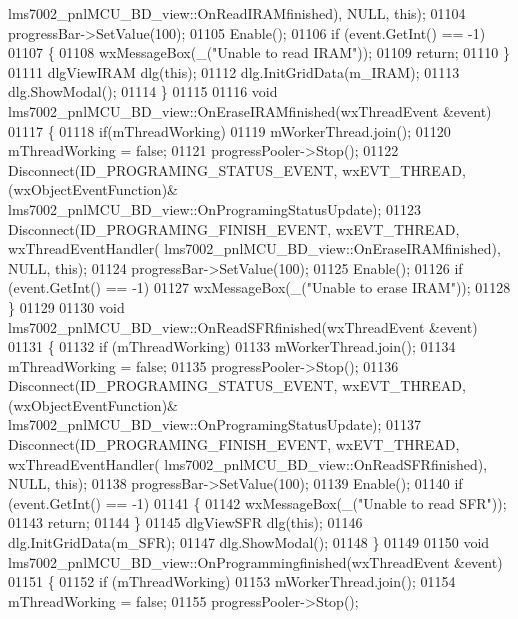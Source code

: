 \begin{DoxyCode}
{{{{{{{{{{{{{{{{{{{      lms7002_pnlMCU_BD_view::OnReadIRAMfinished), NULL, \textcolor{keyword}{this});
01104     progressBar->SetValue(100);
01105     Enable();
01106     \textcolor{keywordflow}{if} (event.GetInt() == -1)
01107     \{
01108         wxMessageBox(\_(\textcolor{stringliteral}{"Unable to read IRAM"}));
01109         \textcolor{keywordflow}{return};
01110     \}
01111     dlgViewIRAM dlg(\textcolor{keyword}{this});
01112     dlg.InitGridData(m_IRAM);
01113     dlg.ShowModal();
01114 \}
01115 
01116 \textcolor{keywordtype}{void} lms7002_pnlMCU_BD_view::OnEraseIRAMfinished(wxThreadEvent &event)
01117 \{
01118     \textcolor{keywordflow}{if}(mThreadWorking)
01119         mWorkerThread.join();
01120     mThreadWorking = \textcolor{keyword}{false};
01121     progressPooler->Stop();
01122     Disconnect(ID_PROGRAMING_STATUS_EVENT, wxEVT\_THREAD, (wxObjectEventFunction)&
      lms7002_pnlMCU_BD_view::OnProgramingStatusUpdate);
01123     Disconnect(ID_PROGRAMING_FINISH_EVENT, wxEVT\_THREAD, wxThreadEventHandler(
      lms7002_pnlMCU_BD_view::OnEraseIRAMfinished), NULL, \textcolor{keyword}{this});
01124     progressBar->SetValue(100);
01125     Enable();
01126     \textcolor{keywordflow}{if} (event.GetInt() == -1)
01127         wxMessageBox(\_(\textcolor{stringliteral}{"Unable to erase IRAM"}));
01128 \}
01129 
01130 \textcolor{keywordtype}{void} lms7002_pnlMCU_BD_view::OnReadSFRfinished(wxThreadEvent &event)
01131 \{
01132     \textcolor{keywordflow}{if} (mThreadWorking)
01133         mWorkerThread.join();
01134     mThreadWorking = \textcolor{keyword}{false};
01135     progressPooler->Stop();
01136     Disconnect(ID_PROGRAMING_STATUS_EVENT, wxEVT\_THREAD, (wxObjectEventFunction)&
      lms7002_pnlMCU_BD_view::OnProgramingStatusUpdate);
01137     Disconnect(ID_PROGRAMING_FINISH_EVENT, wxEVT\_THREAD, wxThreadEventHandler(
      lms7002_pnlMCU_BD_view::OnReadSFRfinished), NULL, \textcolor{keyword}{this});
01138     progressBar->SetValue(100);
01139     Enable();
01140     \textcolor{keywordflow}{if} (event.GetInt() == -1)
01141     \{
01142         wxMessageBox(\_(\textcolor{stringliteral}{"Unable to read SFR"}));
01143         \textcolor{keywordflow}{return};
01144     \}
01145     dlgViewSFR dlg(\textcolor{keyword}{this});
01146     dlg.InitGridData(m_SFR);
01147     dlg.ShowModal();
01148 \}
01149 
01150 \textcolor{keywordtype}{void} lms7002_pnlMCU_BD_view::OnProgrammingfinished(wxThreadEvent &event)
01151 \{
01152     \textcolor{keywordflow}{if} (mThreadWorking)
01153         mWorkerThread.join();
01154     mThreadWorking = \textcolor{keyword}{false};
01155     progressPooler->Stop();
}}}}}}}}}}}}}}}}}}}
\end{DoxyCode}
